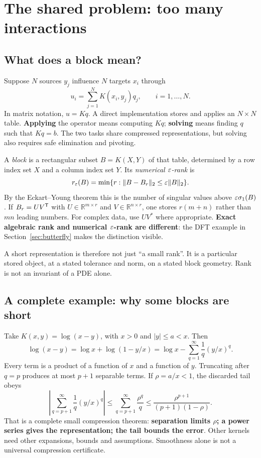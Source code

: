 \section{The shared problem: too many interactions}

\subsection{What does a block mean?}
Suppose $N$ sources $y_j$ influence $N$ targets $x_i$ through
\begin{equation}
 u_i=\sum_{j=1}^{N}K(x_i,y_j)q_j,\qquad i=1,\ldots,N.
 \label{eq:pairwise}
\end{equation}
In matrix notation, $u=Kq$. A direct implementation stores and applies an $N\times N$ table. \textbf{Applying} the operator means computing $Kq$; \textbf{solving} means finding $q$ such that $Kq=b$. The two tasks share compressed representations, but solving also requires safe elimination and pivoting.

A \emph{block} is a rectangular subset $B=K(X,Y)$ of that table, determined by a row index set $X$ and a column index set $Y$. Its \emph{numerical $\varepsilon$-rank} is
\begin{equation}
 r_\varepsilon(B)=\min\{r:\|B-B_r\|_2\leq \varepsilon\|B\|_2\}.
 \label{eq:numericalrank}
\end{equation}
By the Eckart--Young theorem this is the number of singular values above $\varepsilon\sigma_1(B)$. If $B_r=UV^{\mathsf{T}}$ with $U\in\mathbb R^{m\times r}$ and $V\in\mathbb R^{n\times r}$, one stores $r(m+n)$ rather than $mn$ leading numbers. For complex data, use $UV^*$ where appropriate. \textbf{Exact algebraic rank and numerical $\varepsilon$-rank are different}: the DFT example in Section~\ref{sec:butterfly} makes the distinction visible.

A short representation is therefore not just ``a small rank''. It is a particular stored object, at a stated tolerance and norm, on a stated block geometry. Rank is not an invariant of a PDE alone.

\subsection{A complete example: why some blocks are short}
\label{sec:logexample}
Take $K(x,y)=\log(x-y)$, with $x>0$ and $|y|\le a<x$. Then
\begin{equation}
 \log(x-y)=\log x+\log(1-y/x)
 =\log x-\sum_{q=1}^{\infty}\frac{1}{q}(y/x)^q.
 \label{eq:laplaceseries}
\end{equation}
Every term is a product of a function of $x$ and a function of $y$. Truncating after $q=p$ produces at most $p+1$ separable terms. If $\rho=a/x<1$, the discarded tail obeys
\begin{equation}
 \left|\sum_{q=p+1}^{\infty}\frac{1}{q}(y/x)^q\right|
 \leq \sum_{q=p+1}^{\infty}\frac{\rho^q}{q}
 \leq \frac{\rho^{p+1}}{(p+1)(1-\rho)}.
 \label{eq:logbound}
\end{equation}
That is a complete small compression theorem: \textbf{separation limits $\rho$; a power series gives the representation; the tail bounds the error}. Other kernels need other expansions, bounds and assumptions. Smoothness alone is not a universal compression certificate.

